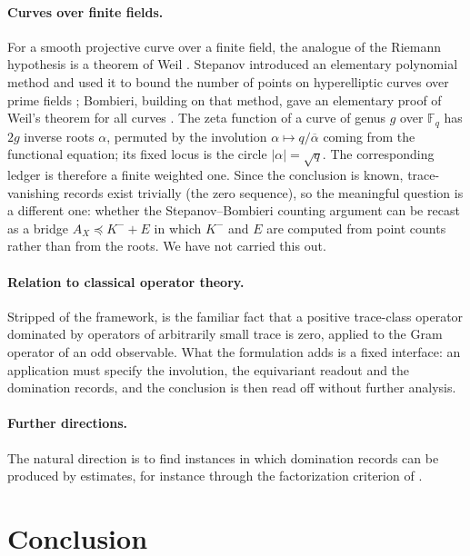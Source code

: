 \documentclass[11pt]{article}
\newcommand{\AX}{A_{X}}
\newcommand{\Kminus}{K^{-}}
\theoremstyle{definition}
\begin{document}
\paragraph{Curves over finite fields.}
For a smooth projective curve over a finite field, the analogue of the
Riemann hypothesis is a theorem of Weil \citep{Weil1948a,Weil1948b}.
Stepanov introduced an elementary polynomial method and used it to
bound the number of points on hyperelliptic curves over prime fields
\citep{Stepanov1969}; Bombieri, building on that method, gave an
elementary proof of Weil's theorem for all curves \citep{Bombieri1974}.
The zeta function of a curve of genus \(g\) over \(\mathbb F_q\) has
\(2g\) inverse roots \(\alpha\), permuted by the involution
\(\alpha\mapsto q/\overline{\alpha}\) coming from the functional
equation; its fixed locus is the circle \(|\alpha|=\sqrt q\).  The
corresponding ledger is therefore a finite weighted one.  Since the
conclusion is known, trace-vanishing records exist trivially (the zero
sequence), so the meaningful question is a different one: whether the
Stepanov--Bombieri counting argument can be recast as a bridge
\(\AX\preceq\Kminus+E\) in which \(\Kminus\) and \(E\) are computed
from point counts rather than from the roots.  We have not carried
this out.

\paragraph{Relation to classical operator theory.}
Stripped of the framework, 
is the familiar fact that a positive trace-class operator dominated by
operators of arbitrarily small trace is zero, applied to the Gram
operator of an odd observable.  What the formulation adds is a fixed
interface: an application must specify the involution, the equivariant
readout and the domination records, and the conclusion is then read
off without further analysis.

\paragraph{Further directions.}
The natural direction is to find instances in which domination
records can be produced by estimates, for instance through the
factorization criterion of .
 \section{Conclusion}
\label{sec:conclusion}
\end{document}
